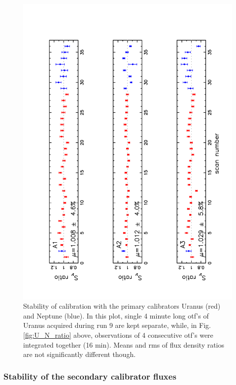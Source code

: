 \begin{figure}[p]
\begin{center}
  \includegraphics[clip, angle=-90, scale=0.6]{Figures/Flux_ratio_index_A1_A2_A3.pdf}
  \caption{Stability of calibration with the primary calibrators Uranus (red) and Neptune (blue).
    In this plot, single 4 minute long otf's of Uranus acquired during
    run 9 are kept separate, 
while, in Fig.\ref{fig:U_N_ratio} above, observations of 4 consecutive otf's were integrated together (16 min).
    Means and rms of flux density ratios are not significantly different though.}
\label{fig:U_otf_indiv}
\end{center}
\end{figure}

\subsubsection{Stability of the secondary calibrator fluxes}

